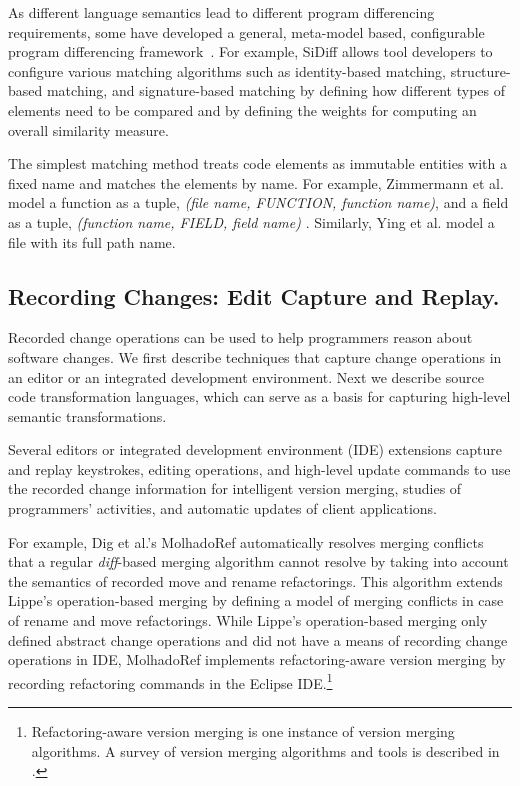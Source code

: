 \documentclass[runningheads,a4paper]{llncs}
\begin{document}
As different language semantics lead to different program differencing requirements, some have developed a general, meta-model based, configurable program differencing framework~\cite{Schmidt2008:sidiff, EMF}. For example, SiDiff \cite{Schmidt2008:sidiff,Treude2007} allows tool developers to configure various matching algorithms such as identity-based matching, structure-based matching, and signature-based matching by defining how different types of elements need to be compared and by defining the weights for computing an overall similarity measure.

The simplest matching method treats code elements as immutable entities with a fixed name and matches the elements by name. For example, Zimmermann et al. model a function as a tuple, \textit{(file name, FUNCTION, function name)}, and a field as a tuple, \textit{(function name, FIELD, field name)} \cite{Zimmermann2004}. Similarly, Ying et al. \cite{Ying2004} model a file with its full path name. %

\subsection{Recording Changes: Edit Capture and Replay.} 
Recorded change operations can be used to help programmers reason about software changes. We first describe techniques that capture change operations in an editor or an integrated development environment. Next we describe source code transformation languages, which can serve as a basis for capturing high-level semantic transformations. 

Several editors or integrated development environment (IDE) extensions capture and replay keystrokes, editing operations, and high-level update commands to use the recorded change information for intelligent version merging, studies of programmers' activities, and automatic updates of client applications. 

For example, Dig et al.'s MolhadoRef \cite{Dig2007} automatically resolves merging conflicts that a regular {\it diff}-based merging algorithm cannot resolve by taking into account the semantics of recorded move and rename refactorings. This algorithm extends Lippe's operation-based merging \cite{Lippe1992} by defining a model of merging conflicts in case of rename and move refactorings. While Lippe's operation-based merging only defined abstract change operations and did not have a means of recording change operations in IDE, MolhadoRef implements refactoring-aware version merging by recording refactoring commands in the Eclipse IDE.\footnote{Refactoring-aware version merging is one instance of version merging algorithms. A survey of version merging algorithms and tools is described in \cite{mens:survey02}.}
\end{document}
